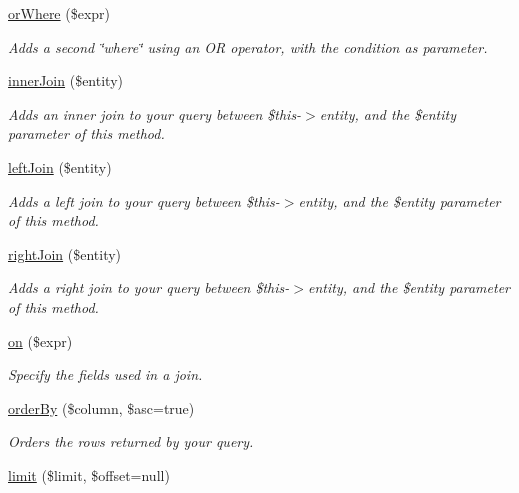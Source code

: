 \begin{DoxyCompactItemize}
\hyperlink{class_eiron_1_1_o_r_m_1_1_query_builder_a90c6e6969ef52a27880a40486d1c9d3b}{or\+Where} (\$expr)
\begin{DoxyCompactList}\small\item\em Adds a second \char`\"{}where\char`\"{} using an OR operator, with the condition as parameter. \end{DoxyCompactList}\item 
\hyperlink{class_eiron_1_1_o_r_m_1_1_query_builder_a00f8f2b1018bc1f3f449e34abe1d12a4}{inner\+Join} (\$entity)
\begin{DoxyCompactList}\small\item\em Adds an inner join to your query between \$this-\/$>$entity, and the \$entity parameter of this method. \end{DoxyCompactList}\item 
\hyperlink{class_eiron_1_1_o_r_m_1_1_query_builder_acbaa126594294ef160748e1bdf9aa74b}{left\+Join} (\$entity)
\begin{DoxyCompactList}\small\item\em Adds a left join to your query between \$this-\/$>$entity, and the \$entity parameter of this method. \end{DoxyCompactList}\item 
\hyperlink{class_eiron_1_1_o_r_m_1_1_query_builder_a791b13a237e96ea44655edc7f602faa1}{right\+Join} (\$entity)
\begin{DoxyCompactList}\small\item\em Adds a right join to your query between \$this-\/$>$entity, and the \$entity parameter of this method. \end{DoxyCompactList}\item 
\hyperlink{class_eiron_1_1_o_r_m_1_1_query_builder_afda91cfd3a428392f444082b4a14cd88}{on} (\$expr)
\begin{DoxyCompactList}\small\item\em Specify the fields used in a join. \end{DoxyCompactList}\item 
\hyperlink{class_eiron_1_1_o_r_m_1_1_query_builder_a68517a42061ced70872c6de90c2dcd3f}{order\+By} (\$column, \$asc=true)
\begin{DoxyCompactList}\small\item\em Orders the rows returned by your query. \end{DoxyCompactList}\item 
\hyperlink{class_eiron_1_1_o_r_m_1_1_query_builder_a3cd93d792e7e3d58d41e81c1d2ec740f}{limit} (\$limit, \$offset=null)

\end{DoxyCompactItemize}
